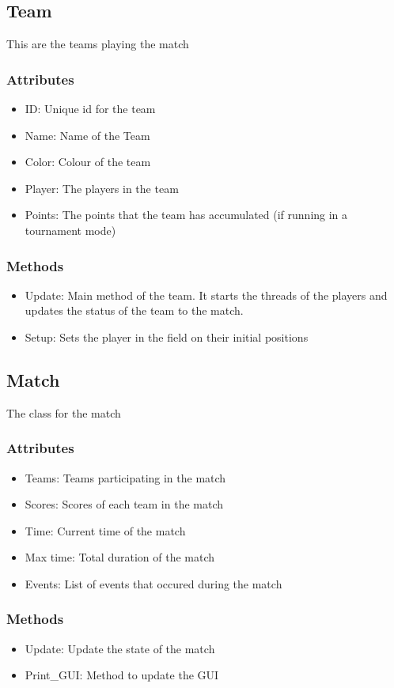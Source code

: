 \documentclass{article}
\theoremstyle{mytheoremstyle}
\theoremstyle{mytheoremstyle}
\theoremstyle{myproblemstyle}
\begin{document}
    \subsection{Team}
    This are the teams playing the match
    \subsubsection{Attributes}
    \begin{itemize}
        \item ID: Unique id for the team
        \item Name: Name of the Team
        \item Color: Colour of the team
        \item Player: The players in the team
        \item Points: The points that the team has accumulated (if running in a tournament mode)
    \end{itemize}
    \subsubsection{Methods}
    \begin{itemize}
        \item Update: Main method of the team. It starts the threads of the players and updates the status of the team to the match.
        \item Setup: Sets the player in the field on their initial positions
    \end{itemize}

    \subsection{Match}
    The class for the match
    \subsubsection{Attributes}
    \begin{itemize}
        \item Teams: Teams participating in the match
        \item Scores: Scores of each team in the match
        \item Time: Current time of the match
        \item Max time: Total duration of the match
        \item Events: List of events that occured during the match
    \end{itemize}
    
    \subsubsection{Methods}
    \begin{itemize}
        \item Update: Update the state of the match
        \item Print\_GUI: Method to update the GUI
    \end{itemize}
\end{document}
